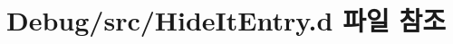 \hypertarget{_hide_it_entry_8d}{\section{Debug/src/\+Hide\+It\+Entry.d 파일 참조}
\label{_hide_it_entry_8d}
}
